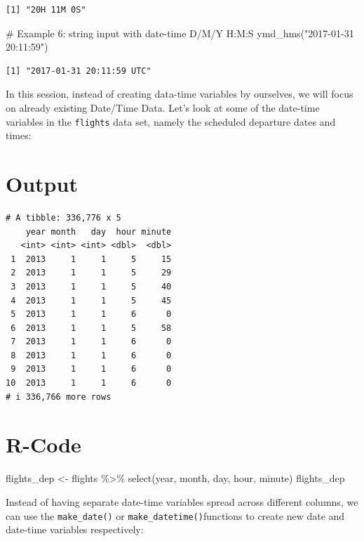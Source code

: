 \documentclass[
  letterpaper,
  DIV=11,
  numbers=noendperiod]{scrartcl}
\newenvironment{Shaded}{\begin{snugshade}}{\end{snugshade}}
\newcommand{\CommentTok}[1]{\textcolor[rgb]{0.37,0.37,0.37}{#1}}
\newcommand{\FunctionTok}[1]{\textcolor[rgb]{0.28,0.35,0.67}{#1}}
\newcommand{\NormalTok}[1]{\textcolor[rgb]{0.00,0.23,0.31}{#1}}
\newcommand{\OtherTok}[1]{\textcolor[rgb]{0.00,0.23,0.31}{#1}}
\newcommand{\SpecialCharTok}[1]{\textcolor[rgb]{0.37,0.37,0.37}{#1}}
\newcommand{\StringTok}[1]{\textcolor[rgb]{0.13,0.47,0.30}{#1}}
\begin{document}
\begin{verbatim}
[1] "20H 11M 0S"
\end{verbatim}

\begin{Shaded}
\begin{Highlighting}[]
\CommentTok{\# Example 6:  string input with date{-}time D/M/Y H:M:S}
\FunctionTok{ymd\_hms}\NormalTok{(}\StringTok{"2017{-}01{-}31 20:11:59"}\NormalTok{)}
\end{Highlighting}
\end{Shaded}

\begin{verbatim}
[1] "2017-01-31 20:11:59 UTC"
\end{verbatim}

In this session, instead of creating data-time variables by ourselves,
we will focus on already existing Date/Time Data. Let's look at some of
the date-time variables in the \texttt{flights} data set, namely the
scheduled departure dates and times:

\section{Output}

\begin{verbatim}
# A tibble: 336,776 x 5
    year month   day  hour minute
   <int> <int> <int> <dbl>  <dbl>
 1  2013     1     1     5     15
 2  2013     1     1     5     29
 3  2013     1     1     5     40
 4  2013     1     1     5     45
 5  2013     1     1     6      0
 6  2013     1     1     5     58
 7  2013     1     1     6      0
 8  2013     1     1     6      0
 9  2013     1     1     6      0
10  2013     1     1     6      0
# i 336,766 more rows
\end{verbatim}

\section{R-Code}

\begin{Shaded}
\begin{Highlighting}[]
\NormalTok{flights\_dep }\OtherTok{\textless{}{-}}\NormalTok{ flights }\SpecialCharTok{\%\textgreater{}\%}
  \FunctionTok{select}\NormalTok{(year, month, day, hour, minute)}
\NormalTok{flights\_dep}
\end{Highlighting}
\end{Shaded}

Instead of having separate date-time variables spread across different
columns, we can use the \texttt{make\_date()} or
\texttt{make\_datetime()}functions to create new date and date-time
variables respectively:
\end{document}
